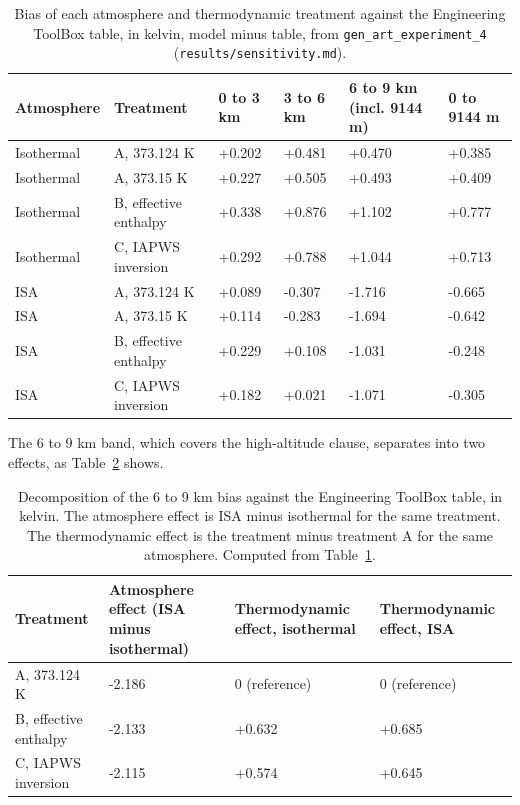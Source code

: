 \documentclass[11pt,letterpaper]{article}
\begin{document}
\begin{table}[!htbp]
\centering\small
\caption{Bias of each atmosphere and thermodynamic treatment against the Engineering ToolBox table, in kelvin, model minus table, from \texttt{gen\_art\_experiment\_4} (\texttt{results/sensitivity.md}).}\label{tab:t9}
\begin{tabular}{llp{2.2cm}p{2.2cm}p{2.6cm}p{2.4cm}}
\toprule
Atmosphere & Treatment & 0 to 3 km & 3 to 6 km & 6 to 9 km (incl. 9144 m) & 0 to 9144 m \\
\midrule
Isothermal & A, 373.124 K & +0.202 & +0.481 & +0.470 & +0.385 \\
Isothermal & A, 373.15 K & +0.227 & +0.505 & +0.493 & +0.409 \\
Isothermal & B, effective enthalpy & +0.338 & +0.876 & +1.102 & +0.777 \\
Isothermal & C, IAPWS inversion & +0.292 & +0.788 & +1.044 & +0.713 \\
ISA & A, 373.124 K & +0.089 & -0.307 & -1.716 & -0.665 \\
ISA & A, 373.15 K & +0.114 & -0.283 & -1.694 & -0.642 \\
ISA & B, effective enthalpy & +0.229 & +0.108 & -1.031 & -0.248 \\
ISA & C, IAPWS inversion & +0.182 & +0.021 & -1.071 & -0.305 \\
\bottomrule
\end{tabular}
\end{table}

The 6 to 9 km band, which covers the high-altitude clause, separates into two effects, as Table~\ref{tab:t10} shows.

\begin{table}[!htbp]
\centering\small
\caption{Decomposition of the 6 to 9 km bias against the Engineering ToolBox table, in kelvin. The atmosphere effect is ISA minus isothermal for the same treatment. The thermodynamic effect is the treatment minus treatment A for the same atmosphere. Computed from Table~\ref{tab:t9}.}\label{tab:t10}
\begin{tabular}{lp{2.6cm}p{2.8cm}p{2.8cm}}
\toprule
Treatment & Atmosphere effect (ISA minus isothermal) & Thermodynamic effect, isothermal & Thermodynamic effect, ISA \\
\midrule
A, 373.124 K & -2.186 & 0 (reference) & 0 (reference) \\
B, effective enthalpy & -2.133 & +0.632 & +0.685 \\
C, IAPWS inversion & -2.115 & +0.574 & +0.645 \\
\bottomrule
\end{tabular}
\end{table}
\end{document}
